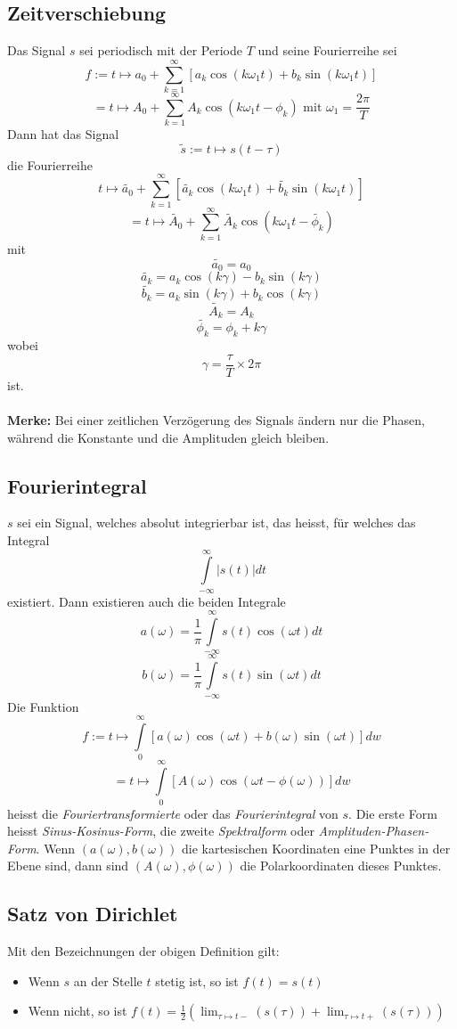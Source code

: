 \subsection{Zeitverschiebung}

Das Signal $s$ sei periodisch mit der Periode $T$ und seine Fourierreihe sei
$$f:= t \mapsto a_0 + \sum_{k=1}^{\infty} \left[a_k\cos(k\omega_1t)
    + b_k\sin(k\omega_1t)\right]$$
$$= t \mapsto A_0 + \sum_{k=1}^{\infty} A_k \cos(k\omega_1t - \phi_k)
    \textrm{ mit } \omega_1 = \frac{2\pi}{T}$$
Dann hat das Signal
$$\tilde{s} := t \mapsto s(t-\tau)$$
die Fourierreihe
$$t \mapsto \widetilde{a_0} + \sum_{k=1}^{\infty} \left[\widetilde{a_k}
    \cos(k\omega_1t) + \widetilde{b_k}\sin(k\omega_1t)\right]$$
$$= t \mapsto \widetilde{A_0} + \sum_{k=1}^{\infty}
    \widetilde{A_k}\cos(k\omega_1t - \widetilde{\phi_k})$$
mit
$$\widetilde{a_0} = a_0$$
$$\widetilde{a_k} = a_k\cos(k\gamma) - b_k\sin(k\gamma)$$
$$\widetilde{b_k} = a_k\sin(k\gamma) + b_k\cos(k\gamma)$$
$$\widetilde{A_k} = A_k$$
$$\widetilde{\phi_k} = \phi_k + k\gamma$$
wobei
$$\gamma = \frac{\tau}{T} \times 2\pi$$
ist.\\\\
\textbf{Merke:} Bei einer zeitlichen Verzögerung des Signals ändern nur die
Phasen, während die Konstante und die Amplituden gleich bleiben.


\subsection{Fourierintegral}

$s$ sei ein Signal, welches absolut integrierbar ist, das heisst, für welches
das Integral
$$\int\limits_{-\infty}^{\infty} |s(t)|dt$$
existiert. Dann existieren auch die beiden Integrale
$$a(\omega) = \frac{1}{\pi} \int\limits_{-\infty}^{\infty} s(t)
    \cos(\omega t)dt$$
$$b(\omega) = \frac{1}{\pi} \int\limits_{-\infty}^{\infty} s(t)
    \sin(\omega t)dt$$
Die Funktion
$$f := t \mapsto \int\limits_0^{\infty} \left[ a(\omega) \cos(\omega t)
    + b(\omega) \sin(\omega t)\right]dw$$
$$=t \mapsto \int\limits_0^{\infty} \left[A(\omega) \cos(\omega t
    - \phi (\omega))\right]dw$$
heisst die \emph{Fouriertransformierte} oder das \emph{Fourierintegral} von
$s$. Die erste Form heisst \emph{Sinus-Kosinus-Form}, die zweite
\emph{Spektralform} oder \emph{Amplituden-Phasen-Form}. Wenn
$(a(\omega), b(\omega))$ die kartesischen Koordinaten eine Punktes in der Ebene
sind, dann sind $(A(\omega), \phi(\omega))$ die Polarkoordinaten dieses Punktes.


\subsection{Satz von Dirichlet}

Mit den Bezeichnungen der obigen Definition gilt:
\begin{itemize}
\item Wenn $s$ an der Stelle $t$ stetig ist, so ist $f(t) = s(t)$
\item Wenn nicht, so ist $\displaystyle f(t) = \frac{1}{2} \left(\lim_{\tau
    \mapsto t-}(s(\tau)) + \lim_{\tau \mapsto t+}(s(\tau))\right)$
\end{itemize}
